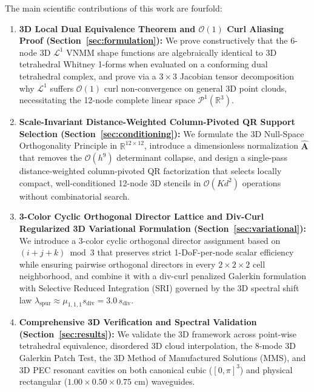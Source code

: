 \documentclass[preprint,12pt]{elsarticle}
\newcommand{\R}{\mathbb{R}}
\begin{document}
The main scientific contributions of this work are fourfold:
\begin{enumerate}
    \item \textbf{3D Local Dual Equivalence Theorem and $\mathcal{O}(1)$ Curl Aliasing Proof (Section~\ref{sec:formulation}):} We prove constructively that the 6-node 3D $\mathcal{L}^1$ VNMM shape functions are algebraically identical to 3D tetrahedral Whitney 1-forms when evaluated on a conforming dual tetrahedral complex, and prove via a $3\times 3$ Jacobian tensor decomposition why $\mathcal{L}^1$ suffers $\mathcal{O}(1)$ curl non-convergence on general 3D point clouds, necessitating the 12-node complete linear space $\mathcal{P}^1(\R^3)$.
    \item \textbf{Scale-Invariant Distance-Weighted Column-Pivoted QR Support Selection (Section~\ref{sec:conditioning}):} We formulate the 3D Null-Space Orthogonality Principle in $\R^{12\times 12}$, introduce a dimensionless normalization $\widehat{\mathbf{A}}$ that removes the $\mathcal{O}(h^9)$ determinant collapse, and design a single-pass distance-weighted column-pivoted QR factorization that selects locally compact, well-conditioned 12-node 3D stencils in $\mathcal{O}(K d^2)$ operations without combinatorial search.
    \item \textbf{3-Color Cyclic Orthogonal Director Lattice and Div-Curl Regularized 3D Variational Formulation (Section~\ref{sec:variational}):} We introduce a 3-color cyclic orthogonal director assignment based on $(i+j+k)\bmod 3$ that preserves strict 1-DoF-per-node scalar efficiency while ensuring pairwise orthogonal directors in every $2\times 2\times 2$ cell neighborhood, and combine it with a div-curl penalized Galerkin formulation with Selective Reduced Integration (SRI) governed by the 3D spectral shift law $\lambda_{\text{spur}} \approx \mu_{1,1,1}s_{\text{div}} = 3.0\,s_{\text{div}}$.
    \item \textbf{Comprehensive 3D Verification and Spectral Validation (Section~\ref{sec:results}):} We validate the 3D framework across point-wise tetrahedral equivalence, disordered 3D cloud interpolation, the 8-mode 3D Galerkin Patch Test, the 3D Method of Manufactured Solutions (MMS), and 3D PEC resonant cavities on both canonical cubic ($[0,\pi]^3$) and physical rectangular ($1.00 \times 0.50 \times 0.75\text{ cm}$) waveguides.
\end{enumerate}

\end{document}
